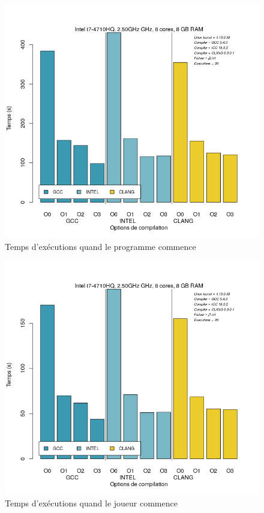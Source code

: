 \documentclass[
 aip,
 jmp,
 amsmath,amssymb,
 reprint
]{revtex4-1}
\begin{document}
\begin{figure}[H]
  \includegraphics[width=\linewidth, keepaspectratio=true]{GCCvsICCvsCLANG_j2.png}
  \caption{Temps d'exécutions quand le programme commence\label{Fig:temps_exec_j2}}
  \end{figure}
\begin{figure}[H]
  \includegraphics[width=\linewidth, keepaspectratio=true]{GCCvsICCvsCLANG_j1.png}
  \caption{Temps d'exécutions quand le joueur commence\label{Fig:temps_exec_j1}}
\end{figure}
\end{document}
